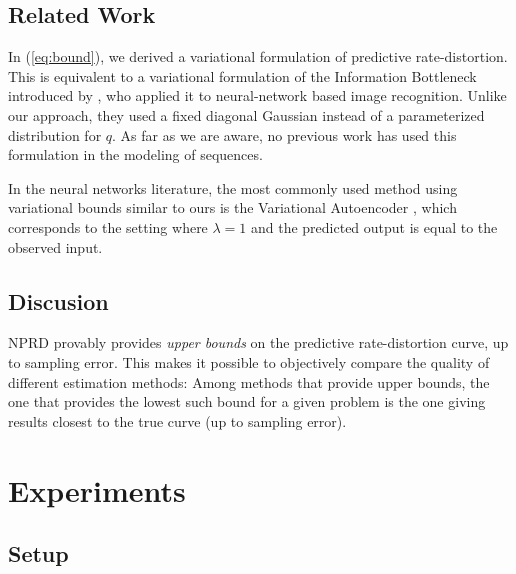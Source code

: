 \documentclass[11pt,letterpaper]{article}
\begin{document}
\subsection{Related Work}
In (\ref{eq:bound}), we derived a variational formulation of predictive rate-distortion.
This is equivalent to a variational formulation of the Information Bottleneck introduced by \cite{alemi-deep-2016}, who applied it to neural-network based image recognition.
Unlike our approach, they used a fixed diagonal Gaussian instead of a parameterized distribution for $q$.
As far as we are aware, no previous work has used this formulation in the modeling of sequences.

In the neural networks literature, the most commonly used method using variational bounds similar to ours is the Variational Autoencoder \citep{kingma-auto-encoding-2014}, which corresponds to the setting where $\lambda=1$ and the predicted output is equal to the observed input.



\subsection{Discusion}

NPRD provably provides \emph{upper bounds} on the predictive rate-distortion curve, up to sampling error.
This makes it possible to objectively compare the quality of different estimation methods:
Among methods that provide upper bounds, the one that provides the lowest such bound for a given problem is the one giving results closest to the true curve (up to sampling error).

\section{Experiments}

\subsection{Setup}
\end{document}
